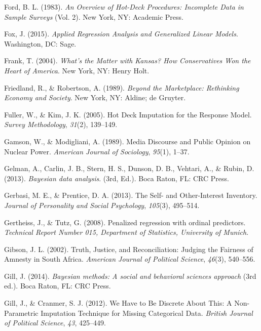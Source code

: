 \documentclass[12pt,econ]{sources/authesis}
\begin{document}
\leavevmode\hypertarget{ref-ford_1983_overview}{}%
Ford, B. L. (1983). \emph{An Overview of Hot-Deck Procedures: Incomplete Data in Sample Surveys} (Vol. 2). New York, NY: Academic Press.

\leavevmode\hypertarget{ref-fox_applied_2015}{}%
Fox, J. (2015). \emph{Applied Regression Analysis and Generalized Linear Models}. Washington, DC: Sage.

\leavevmode\hypertarget{ref-frank_whats_2004}{}%
Frank, T. (2004). \emph{What's the Matter with Kansas? How Conservatives Won the Heart of America}. New York, NY: Henry Holt.

\leavevmode\hypertarget{ref-friedland_beyond_1989}{}%
Friedland, R., \& Robertson, A. (1989). \emph{Beyond the Marketplace: Rethinking Economy and Society}. New York, NY: Aldine; de Gruyter.

\leavevmode\hypertarget{ref-fuller_2005_deck}{}%
Fuller, W., \& Kim, J. K. (2005). Hot Deck Imputation for the Response Model. \emph{Survey Methodology}, \emph{31}(2), 139--149.

\leavevmode\hypertarget{ref-gamson_media_1989}{}%
Gamson, W., \& Modigliani, A. (1989). Media Discourse and Public Opinion on Nuclear Power. \emph{American Journal of Sociology}, \emph{95}(1), 1--37.

\leavevmode\hypertarget{ref-gelman_2013_bayesian}{}%
Gelman, A., Carlin, J. B., Stern, H. S., Dunson, D. B., Vehtari, A., \& Rubin, D. (2013). \emph{Bayesian data analysis}. (3rd, Ed.). Boca Raton, FL: CRC Press.

\leavevmode\hypertarget{ref-gerbasi_2013_self}{}%
Gerbasi, M. E., \& Prentice, D. A. (2013). The Self- and Other-Interest Inventory. \emph{Journal of Personality and Social Psychology}, \emph{105}(3), 495--514.

\leavevmode\hypertarget{ref-gertheiss_2008_penalized}{}%
Gertheiss, J., \& Tutz, G. (2008). Penalized regression with ordinal predictors. \emph{Technical Report Number 015, Department of Statistics, University of Munich}.

\leavevmode\hypertarget{ref-gibson_2002_truth}{}%
Gibson, J. L. (2002). Truth, Justice, and Reconciliation: Judging the Fairness of Amnesty in South Africa. \emph{American Journal of Political Science}, \emph{46}(3), 540--556.

\leavevmode\hypertarget{ref-gill_2014_bayesian}{}%
Gill, J. (2014). \emph{Bayesian methods: A social and behavioral sciences approach} (3rd ed.). Boca Raton, FL: CRC Press.

\leavevmode\hypertarget{ref-gill_2012_have}{}%
Gill, J., \& Cranmer, S. J. (2012). We Have to Be Discrete About This: A Non-Parametric Imputation Technique for Missing Categorical Data. \emph{British Journal of Political Science}, \emph{43}, 425--449.
\end{document}
